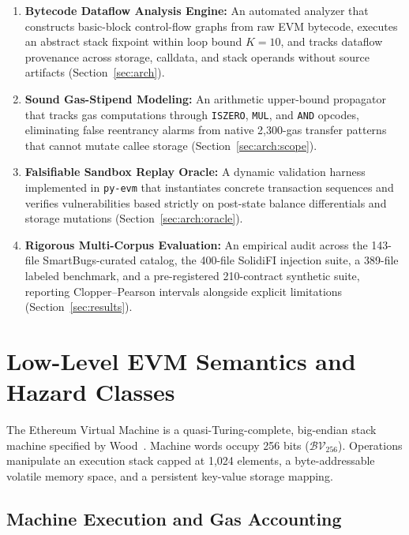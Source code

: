 \documentclass[pdflatex,sn-mathphys]{sn-jnl}
\theoremstyle{thmstyleone}
\theoremstyle{thmstyletwo}
\begin{document}
\begin{enumerate}
    \item \textbf{Bytecode Dataflow Analysis Engine:} An automated analyzer that constructs basic-block control-flow graphs from raw EVM bytecode, executes an abstract stack fixpoint within loop bound $K=10$, and tracks dataflow provenance across storage, calldata, and stack operands without source artifacts (Section~\ref{sec:arch}).
    \item \textbf{Sound Gas-Stipend Modeling:} An arithmetic upper-bound propagator that tracks gas computations through \texttt{ISZERO}, \texttt{MUL}, and \texttt{AND} opcodes, eliminating false reentrancy alarms from native 2,300-gas transfer patterns that cannot mutate callee storage (Section~\ref{sec:arch:scope}).
    \item \textbf{Falsifiable Sandbox Replay Oracle:} A dynamic validation harness implemented in \texttt{py-evm} that instantiates concrete transaction sequences and verifies vulnerabilities based strictly on post-state balance differentials and storage mutations (Section~\ref{sec:arch:oracle}).
    \item \textbf{Rigorous Multi-Corpus Evaluation:} An empirical audit across the 143-file SmartBugs-curated catalog, the 400-file SolidiFI injection suite, a 389-file labeled benchmark, and a pre-registered 210-contract synthetic suite, reporting Clopper--Pearson intervals alongside explicit limitations (Section~\ref{sec:results}).
\end{enumerate}

\section{Low-Level EVM Semantics and Hazard Classes}\label{sec:gaps}

The Ethereum Virtual Machine is a quasi-Turing-complete, big-endian stack machine specified by Wood~\cite{wood2014ethereum}. Machine words occupy 256 bits ($\mathcal{BV}_{256}$). Operations manipulate an execution stack capped at 1,024 elements, a byte-addressable volatile memory space, and a persistent key-value storage mapping.

\subsection{Machine Execution and Gas Accounting}\label{sec:gaps:semantics}
\end{document}
